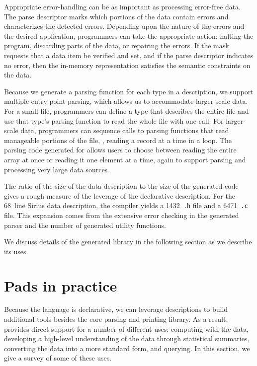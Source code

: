 \documentclass[times]{acm-sigplan}
\newcommand{\dibbler}{Sirius}
\begin{document}
Appropriate error-handling can be as important as processing
error-free data.  The parse descriptor marks which portions of the
data contain errors and characterizes the detected errors.
Depending upon the nature of the errors and the desired application,
programmers can take the appropriate action: halting the program,
discarding parts of the data, or repairing the errors.
If the mask requests
that a data item be verified and set, and if the parse descriptor
indicates no error, then the in-memory representation satisfies the
semantic constraints on the data.

Because we generate a parsing function for each type in a \pads{} description,
we support multiple-entry point parsing, which allows us to 
accommodate larger-scale data.
For a small file, programmers can define a \pads{} type that describes
the entire file and use that type's parsing function to read the whole
file with one call.  For larger-scale data, programmers can sequence
calls to parsing functions that read manageable portions of the file,
\eg{}, reading a record at a time in a loop.  The parsing code generated
for  allows users to choose between reading the entire array
at once or reading it one element at a time, again to support parsing
and processing very large data sources.

The ratio of the size of the data description to the size of the generated code gives a rough measure of the leverage of the
declarative description.  For the 
68~line \dibbler{} data description, the compiler yields a 1432~\texttt{.h} file
and a 6471~\texttt{.c} file.  This expansion comes from the extensive error checking in the generated parser and the number of generated utility functions.

We discuss details of the generated library in the following section
as we describe its uses.

\section{Pads in practice}
Because the \pads{} language is declarative, we can leverage \pads{}
descriptions to build additional tools besides the core parsing and printing
library.  As a result, \pads{} provides direct support for a number
of different uses: computing with the data, developing a high-level
understanding of the data through statistical summaries, converting the data into a more standard form, and querying.  In this section, we give a survey of some of these uses.
\end{document}
